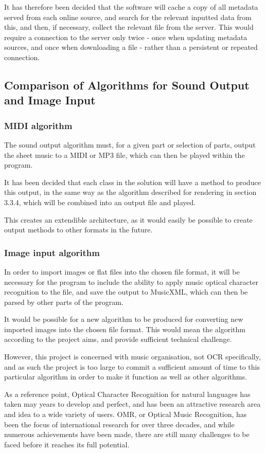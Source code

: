 It has therefore been decided that the software will cache a copy of all metadata served from each online source, and search for the relevant inputted data from this, and then, if necessary, collect the relevant file from the server. This would require a connection to the server only twice - once when updating metadata sources, and once when downloading a file - rather than a persistent or repeated connection.

\subsection{Comparison of Algorithms for Sound Output and Image Input}
\subsubsection{MIDI algorithm}
The sound output algorithm must, for a given part or selection of parts, output the sheet music to a MIDI or MP3 file, which can then be played within the program. 

It has been decided that each class in the solution will have a method to produce this output, in the same way as the algorithm described for rendering in section 3.3.4, which will be combined into an output file and played.

This creates an extendible architecture, as it would easily be possible to create output methods to other formats in the future.

\subsubsection{Image input algorithm}
In order to import images or flat files into the chosen file format, it will be necessary for the program to include the ability to apply music optical character recognition to the file, and save the output to MusicXML, which can then be parsed by other parts of the program. 

It would be possible for a new algorithm to be produced for converting new imported images into the chosen file format. This would mean the algorithm according to the project aims, and provide sufficient technical challenge.

However, this project is concerned with music organisation, not OCR specifically, and as such the project is too large to commit a sufficient amount of time to this particular algorithm in order to make it function as well as other algorithms. 

As a reference point, Optical Character Recognition for natural languages has taken may years to develop and perfect, and has been an attractive research area and idea to a wide variety of users\parencite{InternationalConf}. OMR, or Optical Music Recognition, has been the focus of international research for over three decades, and while numerous achievements have been made, there are still many challenges to be faced before it reaches its full potential\parencite{musicocr}. 


